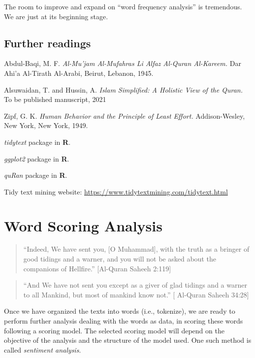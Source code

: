\documentclass[
]{article}
\begin{document}
The room to improve and expand on ``word frequency analysis'' is tremendous. We are just at its beginning stage.

\hypertarget{further-readings-1}{%
\subsection{Further readings}\label{further-readings-1}}

Abdul-Baqi, M. F. \emph{Al-Mu'jam Al-Mufahras Li Alfaz Al-Quran Al-Kareem.} Dar Ahi'a Al-Tirath Al-Arabi, Beirut, Lebanon, 1945. \citep{mujam1945}

Alsuwaidan, T. and Hussin, A. \emph{Islam Simplified: A Holistic View of the Quran.} To be published manuscript, 2021 \citep{alsuwaidan2021}

Zipf, G. K. \emph{Human Behavior and the Principle of Least Effort.} Addison-Wesley, New York, New York, 1949. \citep{zipf1949}

\emph{tidytext} package in \textbf{R}. \citep{tidytext}

\emph{ggplot2} package in \textbf{R}. \citep{ggplot2}

\emph{quRan} package in \textbf{R}. \citep{quRan}

Tidy text mining website: \url{https://www.tidytextmining.com/tidytext.html}

\hypertarget{word-scoring-analysis}{%
\section{Word Scoring Analysis}\label{word-scoring-analysis}}

\begin{quote}
``Indeed, We have sent you, {[}O Muhammad{]}, with the truth as a bringer of good tidings and a warner, and you will not be asked about the companions of Hellfire.'' {[}Al-Quran Saheeh 2:119{]}
\end{quote}

\begin{quote}
``And We have not sent you except as a giver of glad tidings and a warner to all Mankind, but most of mankind know not.'' {[} Al-Quran Saheeh 34:28{]}
\end{quote}

Once we have organized the texts into words (i.e., tokenize), we are ready to perform further analysis dealing with the words as data, in scoring these words following a scoring model. The selected scoring model will depend on the objective of the analysis and the structure of the model used. One such method is called \emph{sentiment analysis}.
\end{document}

